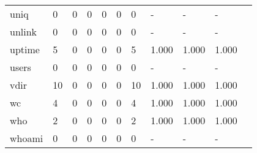 \begin{longtable}{lp{1.10cm}p{1.10cm}p{1.10cm}p{1.10cm}p{1.10cm}p{1.10cm}p{1.10cm}p{1.10cm}p{1.10cm}p{1.10cm}}
uniq      &                      0 &                                  0 &                                 0 &                                0 &                                 0 &                               0 &                              - &                                     - &                                   - \\
unlink    &                      0 &                                  0 &                                 0 &                                0 &                                 0 &                               0 &                              - &                                     - &                                   - \\
uptime    &                      5 &                                  0 &                                 0 &                                0 &                                 0 &                               5 &                          1.000 &                                 1.000 &                               1.000 \\
users     &                      0 &                                  0 &                                 0 &                                0 &                                 0 &                               0 &                              - &                                     - &                                   - \\
vdir      &                     10 &                                  0 &                                 0 &                                0 &                                 0 &                              10 &                          1.000 &                                 1.000 &                               1.000 \\
wc        &                      4 &                                  0 &                                 0 &                                0 &                                 0 &                               4 &                          1.000 &                                 1.000 &                               1.000 \\
who       &                      2 &                                  0 &                                 0 &                                0 &                                 0 &                               2 &                          1.000 &                                 1.000 &                               1.000 \\
whoami    &                      0 &                                  0 &                                 0 &                                0 &                                 0 &                               0 &                              - &                                     - &                                   - \\

\end{longtable}
